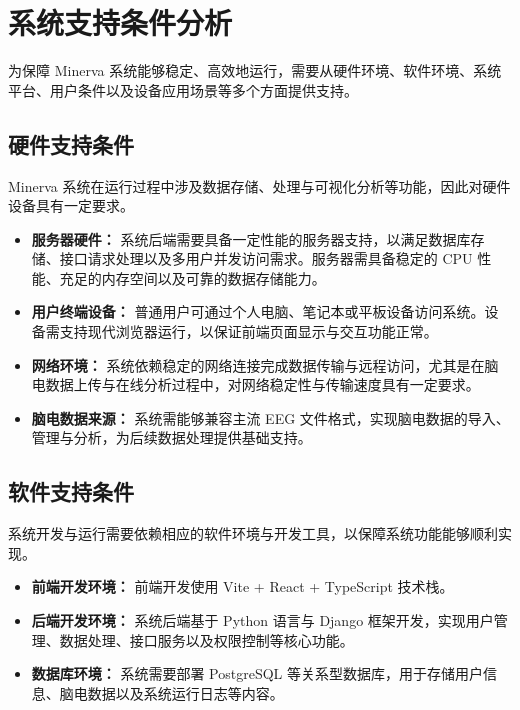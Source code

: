 \section{系统支持条件分析}

为保障 Minerva 系统能够稳定、高效地运行，需要从硬件环境、软件环境、系统平台、用户条件以及设备应用场景等多个方面提供支持。

\subsection{硬件支持条件}

Minerva 系统在运行过程中涉及数据存储、处理与可视化分析等功能，因此对硬件设备具有一定要求。

\begin{itemize}
	\item \textbf{服务器硬件：} 系统后端需要具备一定性能的服务器支持，以满足数据库存储、接口请求处理以及多用户并发访问需求。服务器需具备稳定的 CPU 性能、充足的内存空间以及可靠的数据存储能力。
	
	\item \textbf{用户终端设备：} 普通用户可通过个人电脑、笔记本或平板设备访问系统。设备需支持现代浏览器运行，以保证前端页面显示与交互功能正常。
	
	\item \textbf{网络环境：} 系统依赖稳定的网络连接完成数据传输与远程访问，尤其是在脑电数据上传与在线分析过程中，对网络稳定性与传输速度具有一定要求。
	
	\item \textbf{脑电数据来源：} 系统需能够兼容主流 EEG 文件格式，实现脑电数据的导入、管理与分析，为后续数据处理提供基础支持。
\end{itemize}

\subsection{软件支持条件}

系统开发与运行需要依赖相应的软件环境与开发工具，以保障系统功能能够顺利实现。

\begin{itemize}
	\item \textbf{前端开发环境：} 前端开发使用 Vite + React + TypeScript 技术栈。
	
	\item \textbf{后端开发环境：} 系统后端基于 Python 语言与 Django 框架开发，实现用户管理、数据处理、接口服务以及权限控制等核心功能。

	\item \textbf{数据库环境：} 系统需要部署 PostgreSQL 等关系型数据库，用于存储用户信息、脑电数据以及系统运行日志等内容。
		
\end{itemize}

